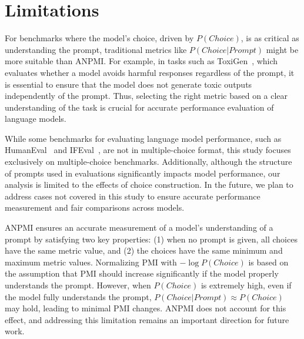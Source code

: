 \section*{Limitations}
\label{sec:limit}

{For benchmarks where the model's choice, driven by \mbox{\small$P(Choice)$}, is as critical as understanding the prompt, traditional metrics like \mbox{\small $P(Choice|Prompt)$} might be more suitable than ANPMI. For example, in tasks such as ToxiGen\mbox{~\cite{hartvigsen2022toxigen}}, which evaluates whether a model avoids harmful responses regardless of the prompt, it is essential to ensure that the model does not generate toxic outputs independently of the prompt. Thus, selecting the right metric based on a clear understanding of the task is crucial for accurate performance evaluation of language models.}

While some benchmarks for evaluating language model performance, such as HumanEval~\cite{chen2021evaluating} and IFEval~\cite{zhou2023instruction}, are not in multiple-choice format, this study focuses exclusively on multiple-choice benchmarks. Additionally, although the structure of prompts used in evaluations significantly impacts model performance, our analysis is limited to the effects of choice construction. In the future, we plan to address cases not covered in this study to ensure accurate performance measurement and fair comparisons across models.

{ANPMI ensures an accurate measurement of a model’s understanding of a prompt by satisfying two key properties: (1) when no prompt is given, all choices have the same metric value, and (2) the choices have the same minimum and maximum metric values. Normalizing PMI with $-\log P(Choice)$ is based on the assumption that PMI should increase significantly if the model properly understands the prompt. However, when $P(Choice)$ is extremely high, even if the model fully understands the prompt, $P(Choice | Prompt) \approx P(Choice)$ may hold, leading to minimal PMI changes. ANPMI does not account for this effect, and addressing this limitation remains an important direction for future work.}